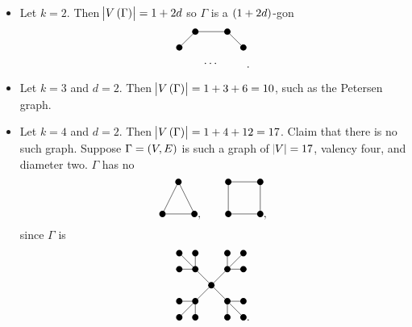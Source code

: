 \begin{example*}
\hfill
\begin{itemize}
\item Let $ k = 2 $. Then $ \abs{V\br{\Gamma}} = 1 + 2d $ so $ \Gamma $ is a $ \br{1 + 2d} $-gon
$$
\begin{tikzpicture}
\fill (0, 0) circle (0.1);
\fill (1, 0) circle (0.1);
\fill (-0.5, -0.5) circle (0.1);
\fill (1.5, -0.5) circle (0.1);
\draw (0.5, -1) node{$ \dots $};
\draw (0, 0) to (1, 0);
\draw (0, 0) to (-0.5, -0.5);
\draw (1, 0) to (1.5, -0.5);
\end{tikzpicture}.
$$
\item Let $ k = 3 $ and $ d = 2 $. Then $ \abs{V\br{\Gamma}} = 1 + 3 + 6 = 10 $, such as the Petersen graph.
\item Let $ k = 4 $ and $ d = 2 $. Then $ \abs{V\br{\Gamma}} = 1 + 4 + 12 = 17 $. Claim that there is no such graph. Suppose $ \Gamma = \br{V, E} $ is such a graph of $ \abs{V} = 17 $, valency four, and diameter two. $ \Gamma $ has no
$$
\begin{tikzpicture}
\fill (0, 0) circle (0.1);
\fill (-0.5, -1) circle (0.1);
\fill (0.5, -1) circle (0.1);
\draw (0, 0) to (-0.5, -1);
\draw (0, 0) to (0.5, -1);
\draw (-0.5, -1) to (0.5, -1);
\end{tikzpicture},
\qquad
\begin{tikzpicture}
\fill (0, 0) circle (0.1);
\fill (1, 0) circle (0.1);
\fill (0, -1) circle (0.1);
\fill (1, -1) circle (0.1);
\draw (0, 0) to (1, 0);
\draw (0, 0) to (0, -1);
\draw (1, 0) to (1, -1);
\draw (0, -1) to (1, -1);
\end{tikzpicture},
$$
since $ \Gamma $ is
$$
\begin{tikzpicture}
\fill (0, 0) circle (0.1);
\fill (-0.5, 0.5) circle (0.1);
\fill (0.5, 0.5) circle (0.1);
\fill (-0.5, -0.5) circle (0.1);
\fill (0.5, -0.5) circle (0.1);
\fill (-1, 1) circle (0.1);
\fill (-0.5, 1) circle (0.1);
\fill (0.5, 1) circle (0.1);
\fill (1, 1) circle (0.1);
\fill (-1, 0.5) circle (0.1);
\fill (1, 0.5) circle (0.1);
\fill (-1, -0.5) circle (0.1);
\fill (1, -0.5) circle (0.1);
\fill (-1, -1) circle (0.1);
\fill (-0.5, -1) circle (0.1);
\fill (0.5, -1) circle (0.1);
\fill (1, -1) circle (0.1);
\draw (0, 0) to (-0.5, 0.5);
\draw (0, 0) to (0.5, 0.5);
\draw (0, 0) to (-0.5, -0.5);
\draw (0, 0) to (0.5, -0.5);
\draw (-0.5, 0.5) to (-1, 1);
\draw (-0.5, 0.5) to (-0.5, 1);
\draw (0.5, 0.5) to (0.5, 1);
\draw (0.5, 0.5) to (1, 1);
\draw (-0.5, 0.5) to (-1, 0.5);
\draw (0.5, 0.5) to (1, 0.5);
\draw (-0.5, -0.5) to (-1, -0.5);
\draw (0.5, -0.5) to (1, -0.5);
\draw (-0.5, -0.5) to (-1, -1);
\draw (-0.5, -0.5) to (-0.5, -1);
\draw (0.5, -0.5) to (0.5, -1);
\draw (0.5, -0.5) to (1, -1);
\end{tikzpicture}.
$$


\end{itemize}
\end{example*}
